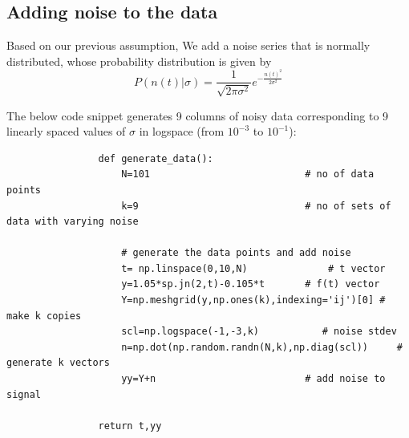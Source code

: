 \documentclass[11pt, a4paper]{article}
\begin{document}
        \subsection{Adding noise to the data}
            Based on our previous assumption, We add a noise series that is normally distributed, whose probability distribution is given by
            \begin{equation}
                P(n(t)|\sigma)=\frac{1}{\sqrt{2\pi\sigma^2}}e^{-\frac{n(t)^2}{2\sigma^2}} \label{eq1}
            \end{equation}
            
            The below code snippet generates 9 columns of noisy data corresponding to 9 linearly spaced values of $\sigma$ in logspace (from $10^{-3}$ to $10^{-1}$):
            \begin{verbatim}
                def generate_data():
                    N=101                           # no of data points
                    k=9                             # no of sets of data with varying noise
    
                    # generate the data points and add noise
                    t= np.linspace(0,10,N)              # t vector
                    y=1.05*sp.jn(2,t)-0.105*t       # f(t) vector
                    Y=np.meshgrid(y,np.ones(k),indexing='ij')[0] # make k copies
                    scl=np.logspace(-1,-3,k)           # noise stdev
                    n=np.dot(np.random.randn(N,k),np.diag(scl))     # generate k vectors
                    yy=Y+n                          # add noise to signal
                    
                return t,yy

            \end{verbatim}
\end{document}
